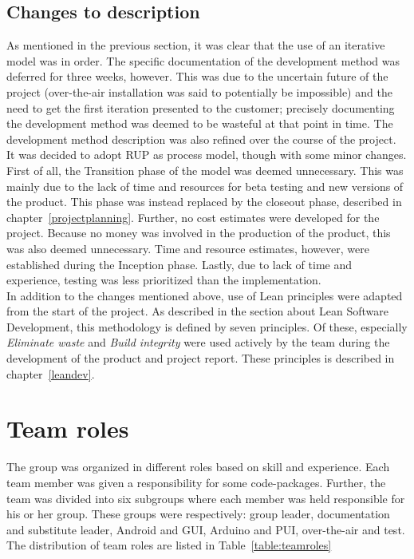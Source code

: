 \subsection{Changes to description}
\label{sec:changes-desc}
As mentioned in the previous section, it was clear that the use of an iterative model was in order. The specific documentation of the development method was deferred for three weeks, however. This was due to the uncertain future of the project (over-the-air installation was said to potentially be impossible) and the need to get the first iteration presented to the customer; precisely documenting the development method was deemed to be wasteful at that point in time. The development method description was also refined over the course of the project.\\
\newline
It was decided to adopt RUP as process model, though with some minor changes. First of all, the Transition phase of the model was deemed unnecessary. This was mainly due to the lack of time and resources for beta testing and new versions of the product. This phase was instead replaced by the closeout phase, described in chapter~\ref{projectplanning}. Further, no cost estimates were developed for the project. Because no money was involved in the production of the product, this was also deemed unnecessary. Time and resource estimates, however, were established during the Inception phase. Lastly, due to lack of time and experience, testing was less prioritized than the implementation.  \\
\newline
In addition to the changes mentioned above, use of Lean principles were adapted from the start of the project. As described in the section about Lean Software Development, this methodology is defined by seven principles. Of these, especially \emph{Eliminate waste} and \emph{Build integrity} were used actively by the team during the development of the product and project report. These principles is described in chapter~\ref{leandev}.

\section{Team roles}
The group was organized in different roles based on skill and experience. Each team member was given a responsibility for some code-packages. Further, the team was divided into six subgroups where each member was held responsible for his or her group. These groups were respectively: group leader, documentation and substitute leader, Android and GUI, Arduino and PUI, over-the-air and test.
The distribution of team roles are listed in Table~\ref{table:teamroles}


